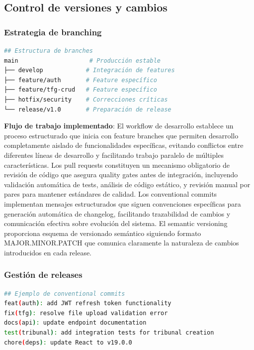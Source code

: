\documentclass[12pt,a4paper,oneside]{report}
\begin{document}
\subsection{Control de versiones y
cambios}\label{control-de-versiones-y-cambios}

\subsubsection{Estrategia de branching}\label{estrategia-de-branching}

\begin{lstlisting}[language=bash]
## Estructura de branches
main                    # Producción estable
├── develop            # Integración de features
├── feature/auth       # Feature específico
├── feature/tfg-crud   # Feature específico
├── hotfix/security    # Correcciones críticas
└── release/v1.0       # Preparación de release
\end{lstlisting}

\textbf{Flujo de trabajo implementado}: El workflow de desarrollo establece un proceso estructurado que inicia con feature branches que permiten desarrollo completamente aislado de funcionalidades específicas, evitando conflictos entre diferentes líneas de desarrollo y facilitando trabajo paralelo de múltiples características. Los pull requests constituyen un mecanismo obligatorio de revisión de código que asegura quality gates antes de integración, incluyendo validación automática de tests, análisis de código estático, y revisión manual por pares para mantener estándares de calidad. Los conventional commits implementan mensajes estructurados que siguen convenciones específicas para generación automática de changelog, facilitando trazabilidad de cambios y comunicación efectiva sobre evolución del sistema. El semantic versioning proporciona esquema de versionado semántico siguiendo formato MAJOR.MINOR.PATCH que comunica claramente la naturaleza de cambios introducidos en cada release.

\subsubsection{Gestión de releases}\label{gestiuxf3n-de-releases}

\begin{lstlisting}[language=bash]
## Ejemplo de conventional commits
feat(auth): add JWT refresh token functionality
fix(tfg): resolve file upload validation error
docs(api): update endpoint documentation
test(tribunal): add integration tests for tribunal creation
chore(deps): update React to v19.0.0
\end{lstlisting}
\end{document}
